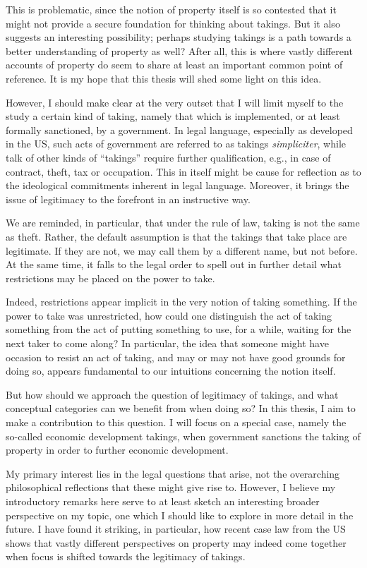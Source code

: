 This is problematic, since the notion of property itself is so contested that it might not provide a secure foundation for thinking about takings. But it also suggests an interesting possibility; perhaps studying takings is a path towards a better understanding of property as well? After all, this is where vastly different accounts of property do seem to share at least an important common point of reference.
It is my hope that this thesis will shed some light on this idea.

However, I should make clear at the very outset that I will limit myself to the study a certain kind of taking, namely that which is implemented, or at least formally sanctioned, by a government. In legal language, especially as developed in the US, such acts of government are referred to as takings {\it simpliciter}, while talk of other kinds of ``takings'' require further qualification, e.g., in case of contract, theft, tax or occupation. This in itself might be cause for reflection as to the ideological commitments inherent in legal language. Moreover, it brings the issue of legitimacy to the forefront in an instructive way.

We are reminded, in particular, that under the rule of law, taking is not the same as theft. Rather, the default assumption is that the takings that take place are legitimate. If they are not, we may call them by a different name, but not before. At the same time, it falls to the legal order to spell out in further detail what restrictions may be placed on the power to take. 

Indeed, restrictions appear implicit in the very notion of taking something. If the power to take was unrestricted, how could one distinguish the act of taking something from the act of putting something to use, for a while, waiting for the next taker to come along? In particular, the idea that someone might have occasion to resist an act of taking, and may or may not have good grounds for doing so, appears fundamental to our intuitions concerning the notion itself.

But how should we approach the question of legitimacy of takings, and what conceptual categories can we benefit from when doing so? In this thesis, I aim to make a contribution to this question. I will focus on a special case, namely the so-called economic development takings, when government sanctions the taking of property in order to further economic development.

My primary interest lies in the legal questions that arise, not the overarching philosophical reflections that these might give rise to. However, I believe my introductory remarks here serve to at least sketch an interesting broader perspective on my topic, one which I should like to explore in more detail in the future. I have found it striking, in particular, how recent case law from the US shows that vastly different perspectives on property may indeed come together when focus is shifted towards the legitimacy of takings.

